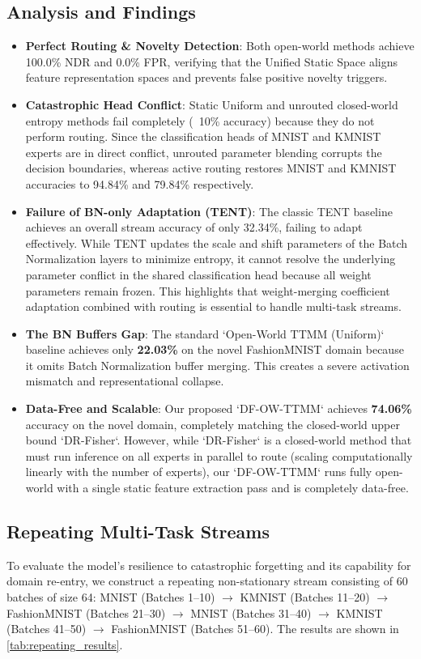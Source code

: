 \documentclass{article}
\theoremstyle{plain}
\theoremstyle{definition}
\theoremstyle{remark}
\begin{document}
\subsection{Analysis and Findings}
\begin{itemize}
    \item \textbf{Perfect Routing \& Novelty Detection}: Both open-world methods achieve 100.0\% NDR and 0.0\% FPR, verifying that the Unified Static Space aligns feature representation spaces and prevents false positive novelty triggers.
    \item \textbf{Catastrophic Head Conflict}: Static Uniform and unrouted closed-world entropy methods fail completely (~10\% accuracy) because they do not perform routing. Since the classification heads of MNIST and KMNIST experts are in direct conflict, unrouted parameter blending corrupts the decision boundaries, whereas active routing restores MNIST and KMNIST accuracies to 94.84\% and 79.84\% respectively.
    \item \textbf{Failure of BN-only Adaptation (TENT)}: The classic TENT baseline achieves an overall stream accuracy of only 32.34\%, failing to adapt effectively. While TENT updates the scale and shift parameters of the Batch Normalization layers to minimize entropy, it cannot resolve the underlying parameter conflict in the shared classification head because all weight parameters remain frozen. This highlights that weight-merging coefficient adaptation combined with routing is essential to handle multi-task streams.
    \item \textbf{The BN Buffers Gap}: The standard `Open-World TTMM (Uniform)` baseline achieves only \textbf{22.03\%} on the novel FashionMNIST domain because it omits Batch Normalization buffer merging. This creates a severe activation mismatch and representational collapse.
    \item \textbf{Data-Free and Scalable}: Our proposed `DF-OW-TTMM` achieves \textbf{74.06\%} accuracy on the novel domain, completely matching the closed-world upper bound `DR-Fisher`. However, while `DR-Fisher` is a closed-world method that must run inference on all experts in parallel to route (scaling computationally linearly with the number of experts), our `DF-OW-TTMM` runs fully open-world with a single static feature extraction pass and is completely data-free.
\end{itemize}

\subsection{Repeating Multi-Task Streams}
To evaluate the model's resilience to catastrophic forgetting and its capability for domain re-entry, we construct a repeating non-stationary stream consisting of 60 batches of size 64: MNIST (Batches 1--10) $\rightarrow$ KMNIST (Batches 11--20) $\rightarrow$ FashionMNIST (Batches 21--30) $\rightarrow$ MNIST (Batches 31--40) $\rightarrow$ KMNIST (Batches 41--50) $\rightarrow$ FashionMNIST (Batches 51--60). The results are shown in \cref{tab:repeating_results}.
\end{document}
